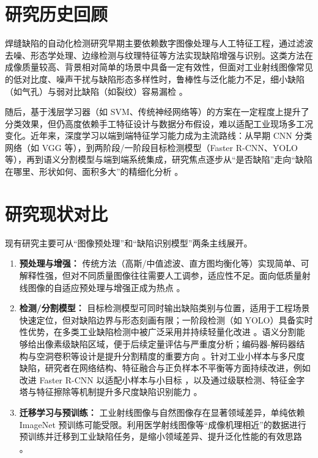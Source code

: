 \documentclass{cjlu_proposal}
\begin{document}
\makeopeningcover

\section{研究历史回顾}
焊缝缺陷的自动化检测研究早期主要依赖数字图像处理与人工特征工程，通过滤波去噪、形态学处理、边缘检测与纹理特征等方法实现缺陷增强与识别。这类方法在成像质量较高、背景相对简单的场景中具备一定有效性，但面对工业射线图像常见的低对比度、噪声干扰与缺陷形态多样性时，鲁棒性与泛化能力不足，细小缺陷（如气孔）与弱对比缺陷（如裂纹）容易漏检 \cite{Valavanis2010_MulticlassDefectDetection, Kumar2014_TextureFeatureWeldFlaws, Hu2020_DeepLearningWeldDefect}。

随后，基于浅层学习器（如 SVM、传统神经网络等）的方案在一定程度上提升了分类效果，但仍高度依赖手工特征设计与数据分布假设，难以适配工业现场多工况变化。近年来，深度学习以端到端特征学习能力成为主流路线：从早期 CNN 分类网络（如 VGG 等），到两阶段/一阶段目标检测模型（Faster R-CNN、YOLO 等），再到语义分割模型与端到端系统集成，研究焦点逐步从“是否缺陷”走向“缺陷在哪里、形状如何、面积多大”的精细化分析 \cite{He2015_DeepResidualLearning, Simonyan2014_VeryDeepCNN, Girshick2015_FastRCNN, Ren2017_FasterRCNN, Redmon2015_YOLO, Ronneberger2015_UNet}。

\section{研究现状对比}
现有研究主要可从“图像预处理”和“缺陷识别模型”两条主线展开。
\begin{enumerate}[leftmargin=*]
  \item \textbf{预处理与增强：} 传统方法（高斯/中值滤波、直方图均衡化等）实现简单、可解释性强，但对不同质量图像往往需要人工调参，适应性不足。面向低质量射线图像的自适应预处理与增强正成为热点 \cite{Hou2020_ReviewWeldDefectDetection, Hu2020_DeepLearningWeldDefect, Guo2021_ContrastEnhancementGAN}。
  \item \textbf{检测/分割模型：} 目标检测模型可同时输出缺陷类别与位置，适用于工程场景快速定位，但对缺陷边界与形态刻画有限；一阶段检测（如 YOLO）具备实时性优势，在多类工业缺陷检测中被广泛采用并持续轻量化改进 \cite{Redmon2015_YOLO, Wei2020_MultiTargetDefectYOLOv3, Zhang2021_ModifiedYOLOv3, Cheng2022_YOLOv5Lightweight}。语义分割能够给出像素级缺陷区域，便于后续定量评估与严重度分析；编码器-解码器结构与空洞卷积等设计是提升分割精度的重要方向 \cite{Chen2018_EncoderDecoderSegmentation}。针对工业小样本与多尺度缺陷，研究者在网络结构、特征融合与正负样本不平衡等方面持续改进，例如改进 Faster R-CNN 以适配小样本与小目标 \cite{Ajmi2023_FasterRCNNWeldDefects, Cao2019_ImprovedFasterRCNN}，以及通过级联检测、特征金字塔与特征擦除等机制提升多尺度缺陷识别能力 \cite{Dai2025_CCBFERCNN, Dong2023_ImprovedCascadeRCNN}。
  \item \textbf{迁移学习与预训练：} 工业射线图像与自然图像存在显著领域差异，单纯依赖 ImageNet 预训练可能受限。利用医学射线图像等“成像机理相近”的数据进行预训练并迁移到工业缺陷任务，是缩小领域差异、提升泛化性能的有效思路 \cite{Yu2025_IndustrialDefectRecognition, Irvin2019_CheXpertDataset, Li2010_ImageNet}。
\end{enumerate}
\end{document}
